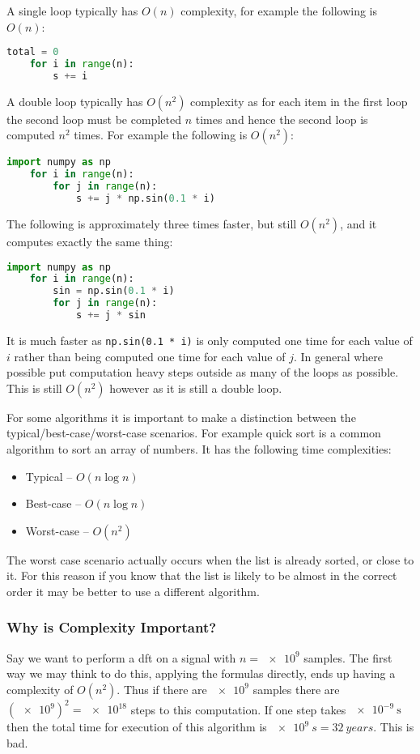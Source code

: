 \documentclass[a4paper]{article}
\begin{document}
    A single loop typically has \(O(n)\) complexity, for example the following is \(O(n)\):
    \begin{lstlisting}[language=python]
    total = 0
    for i in range(n):
        s += i
    \end{lstlisting}
    A double loop typically has \(O(n^2)\) complexity as for each item in the first loop the second loop must be completed \(n\) times and hence the second loop is computed \(n^2\) times.
    For example the following is \(O(n^2)\):
    \begin{lstlisting}[language=python]
    import numpy as np
    for i in range(n):
        for j in range(n):
            s += j * np.sin(0.1 * i)
    \end{lstlisting}
    The following is approximately three times faster, but still \(O(n^2)\), and it computes exactly the same thing:
    \begin{lstlisting}[language=python]
    import numpy as np
    for i in range(n):
        sin = np.sin(0.1 * i)
        for j in range(n):
            s += j * sin
    \end{lstlisting}
    It is much faster as \lstinline|np.sin(0.1 * i)| is only computed one time for each value of \(i\) rather than being computed one time for each value of \(j\).
    In general where possible put computation heavy steps outside as many of the loops as possible.
    This is still \(O(n^2)\) however as it is still a double loop.
    
    For some algorithms it is important to make a distinction between the typical/best-case/worst-case scenarios.
    For example quick sort is a common algorithm to sort an array of numbers.
    It has the following time complexities:
    \begin{itemize}
        \item Typical -- \(O(n\log n)\)
        \item Best-case -- \(O(n\log n)\)
        \item Worst-case -- \(O(n^2)\)
    \end{itemize}
    The worst case scenario actually occurs when the list is already sorted, or close to it.
    For this reason if you know that the list is likely to be almost in the correct order it may be better to use a different algorithm.
    
    \subsubsection{Why is Complexity Important?}
    Say we want to perform a \acrfull{dft} on a signal with \(n = \num{e9}\) samples.
    The first way we may think to do this, applying the formulas directly, ends up having a complexity of \(O(n^2)\).
    Thus if there are \(\num{e9}\) samples there are \((\num{e9})^2 = \num{e18}\) steps to this computation.
    If one step takes \(\SI{e-9}{\second}\) then the total time for execution of this algorithm is \(\SI{e9}{s} = \SI{32}{years}\).
    This is bad.
    
\end{document}
